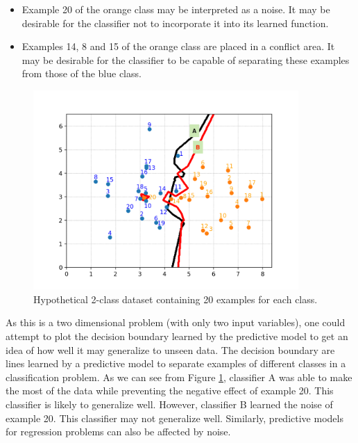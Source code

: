 \begin{itemize}
    \item Example 20 of the orange class may be interpreted as a noise. It may be desirable for the classifier not to incorporate it into its learned function.
    \item Examples 14, 8 and 15 of the orange class are placed in a conflict area. It may be desirable for the classifier to be capable of separating these examples from those of the blue class. %
\end{itemize}


\begin{figure}[h]
    \centering
    \includegraphics[width=0.9\textwidth]{figures/dataset1.png}
    \caption{Hypothetical 2-class dataset containing 20 examples for each class.}
    \label{fig:ds1}
\end{figure}


As this is a two dimensional problem (with only two input variables), one could attempt to plot the decision boundary learned by the predictive model to get an idea of how well it may generalize to unseen data. The decision boundary are lines learned by a predictive model to separate examples of different classes in a classification problem. As we can see from Figure \ref{fig:ds1}, classifier A was able to make the most of the data while preventing the negative effect of example 20. This classifier is likely to generalize well. However, classifier B learned the noise of example 20. This classifier may not generalize well. Similarly, predictive models for regression problems can also be affected by noise.

